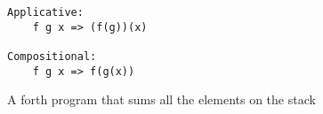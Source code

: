 \begin{figure}[htb]
    \centering
    \begin{lstlisting}
Applicative:
    f g x => (f(g))(x) 

Compositional:
    f g x => f(g(x))
\end{lstlisting}
    \caption{A forth program that sums all the elements on the stack}
    \label{fig:forth_example}
\end{figure}
